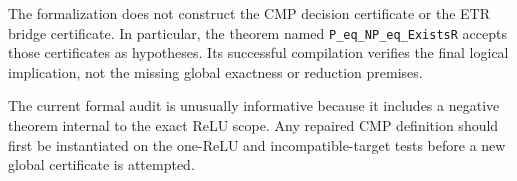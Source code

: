 The formalization does not construct the CMP decision certificate or the ETR
bridge certificate.  In particular, the theorem named
\texttt{P\_eq\_NP\_eq\_ExistsR} accepts those certificates as hypotheses.  Its
successful compilation verifies the final logical implication, not the missing
global exactness or reduction premises.

The current formal audit is unusually informative because it includes a
negative theorem internal to the exact ReLU scope.  Any repaired CMP definition
should first be instantiated on the one-ReLU and incompatible-target tests
before a new global certificate is attempted.
